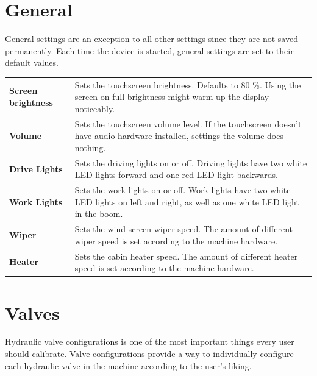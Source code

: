 \documentclass[12pt,a4paper,english]{uvmanual}
\begin{document}
\section{General}\label{ch:settings_general}

General settings are an exception to all other settings since they are not saved permanently. Each time the device is started, general settings are set to their default values.


\begin{tabular}{ L{0.2\textwidth} L{0.66\textwidth} }
\textbf{Screen brightness} & Sets the touchscreen brightness. Defaults to 80 \%. Using the screen on full brightness might warm up the display noticeably. \\
\textbf{Volume} & Sets the touchscreen volume level. If the touchscreen doesn't have audio hardware installed, settings the volume does nothing. \\
\textbf{Drive Lights} & Sets the driving lights on or off. Driving lights have two white LED lights forward and one red LED light backwards. \\
\textbf{Work Lights} & Sets the work lights on or off. Work lights have two white LED lights on left and right, as well as one white LED light in the boom. \\
\textbf{Wiper} & Sets the wind screen wiper speed. The amount of different wiper speed is set according to the machine hardware. \\
\textbf{Heater} & Sets the cabin heater speed. The amount of different heater speed is set according to the machine hardware. \\
\end{tabular}




\section{Valves}\label{ch:settings_valves}

Hydraulic valve configurations is one of the most important things every user should calibrate. Valve configurations provide a way to individually configure each hydraulic valve in the machine according to the user's liking. 

\end{document}
